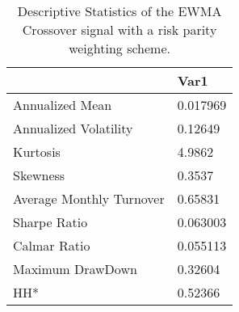 \begin{table}[H]
\centering
\begin{tabular}{ll}
& Var1 \\ 
\hline 
Annualized Mean & 0.017969 \\ 
Annualized Volatility & 0.12649 \\ 
Kurtosis & 4.9862 \\ 
Skewness & 0.3537 \\ 
Average Monthly Turnover & 0.65831 \\ 
Sharpe Ratio & 0.063003 \\ 
Calmar Ratio & 0.055113 \\ 
Maximum DrawDown & 0.32604 \\ 
HH* & 0.52366 \\ 
\hline
\end{tabular}
\caption{Descriptive Statistics of the EWMA Crossover signal with a risk parity weighting scheme.}
\label{MBBSRPNR}
\end{table}